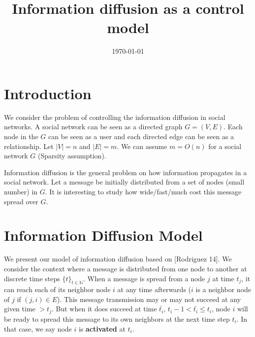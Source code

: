 \documentclass[11pt]{article}
\title{Information diffusion as a control model}
\date{\today}
\begin{document}
\maketitle
\section{Introduction}
We consider the problem of controlling the information diffusion in social networks. A social network can be seen as a directed graph $G=(V,E)$. Each node in the $G$ can be seen as a user and each directed edge can be seen as a relationship. Let $|V|=n$ and $|E|=m$. We can assume $m = O(n)$ for a social network $G$ (Sparsity assumption). 

Information diffusion is the general problem on how information propagates in a social network. Let a message be initially distributed from a set of nodes (small number) in $G$. It is interesting to study how wide/fast/much cost this message spread over $G$. 
\section{Information Diffusion Model}
We present our model of information diffusion based on [Rodriguez 14]. We consider the context where a message is distributed from one node to another at discrete time steps $\{t\}_{t\in{\mathbb{N}}} $. When a message is spread from a node $j$ at time $t_{j}$, it can reach each of its neighbor node $i$ at any time afterwards ($i$ is a neighbor node of $j$ if $(j,i) \in E$). This message transmission may or may not succeed at any given time $> t_{j}$. But when it does succeed at time $\bar{t_{i}}$, $t_{i}-1<\bar{t_{i}} \leq t_{i}$, node $i$ will be ready to spread this message to its own neighbors at the next time step $t_{i}$. In that case, we say node $i$ is {\bf activated} at $t_{i}$. 
  
\end{document}
